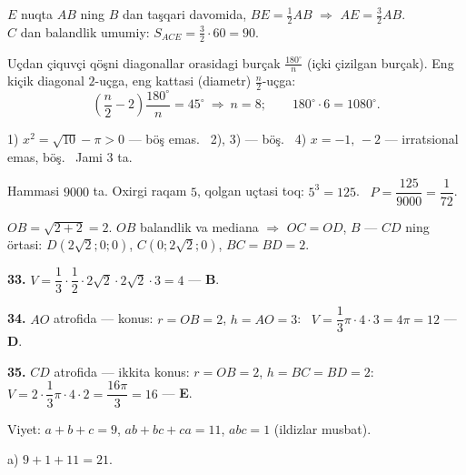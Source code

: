 $E$ nuqta $AB$ ning $B$ dan taşqari davomida, $BE=\frac12AB$ $\Rightarrow$ $AE=\frac32AB$.\\
$C$ dan balandlik umumiy: $S_{ACE}=\frac32\cdot60=90$.

Uçdan çiquvçi qöşni diagonallar orasidagi burçak $\frac{180^\circ}n$ (içki çizilgan burçak). Eng kiçik diagonal $2$-uçga, eng kattasi (diametr) $\frac n2$-uçga:
\[\left(\frac n2-2\right)\frac{180^\circ}n=45^\circ\ \Rightarrow\ n=8;\qquad 180^\circ\cdot6=1080^\circ.\]

1) $x^2=\sqrt{10}-\pi>0$ — böş emas. \ 2), 3) — böş. \ 4) $x=-1,\,-2$ — irratsional emas, böş. \ Jami $3$ ta.

Hammasi $9000$ ta. Oxirgi raqam $5$, qolgan uçtasi toq: $5^3=125$. \ $P=\dfrac{125}{9000}=\dfrac1{72}$.

\newpage
{}
$OB=\sqrt{2+2}=2$. $OB$ balandlik va mediana $\Rightarrow$ $OC=OD$, $B$ — $CD$ ning örtasi: $D\left(2\sqrt2;0;0\right)$, $C\left(0;2\sqrt2;0\right)$, $BC=BD=2$.

\textbf{33.} $V=\dfrac13\cdot\dfrac12\cdot2\sqrt2\cdot2\sqrt2\cdot3=4$ — \textbf{B}.

\textbf{34.} $AO$ atrofida — konus: $r=OB=2$, $h=AO=3$: \ $V=\dfrac13\pi\cdot4\cdot3=4\pi=12$ — \textbf{D}.

\textbf{35.} $CD$ atrofida — ikkita konus: $r=OB=2$, $h=BC=BD=2$:\\
$V=2\cdot\dfrac13\pi\cdot4\cdot2=\dfrac{16\pi}3=16$ — \textbf{E}.

\newpage
{}
Viyet: $a+b+c=9$, $ab+bc+ca=11$, $abc=1$ (ildizlar musbat).

a) $9+1+11=21$.

